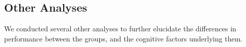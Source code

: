 \documentclass[man,10pt]{apa6}
\begin{document}
\subsection{Other Analyses}
We conducted several other analyses to further elucidate the differences in performance between the groups, and the cognitive factors underlying them.\par
\end{document}

